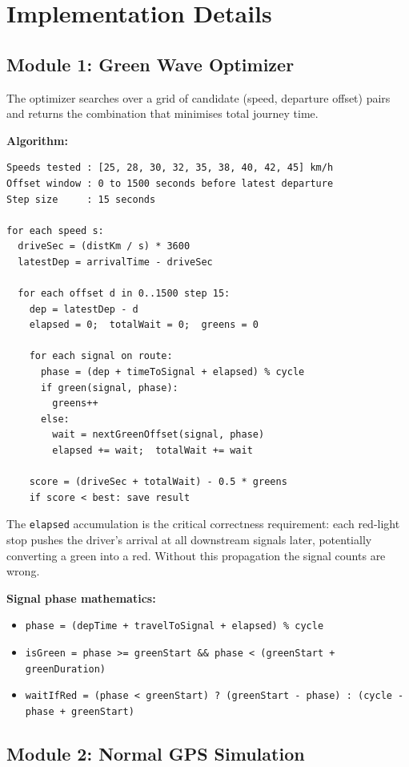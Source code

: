 \documentclass[12pt,a4paper]{report}
\begin{document}
\section{Implementation Details}

\subsection{Module 1: Green Wave Optimizer}

The optimizer searches over a grid of candidate (speed, departure offset) pairs
and returns the combination that minimises total journey time.

\textbf{Algorithm:}
\begin{lstlisting}
Speeds tested : [25, 28, 30, 32, 35, 38, 40, 42, 45] km/h
Offset window : 0 to 1500 seconds before latest departure
Step size     : 15 seconds

for each speed s:
  driveSec = (distKm / s) * 3600
  latestDep = arrivalTime - driveSec

  for each offset d in 0..1500 step 15:
    dep = latestDep - d
    elapsed = 0;  totalWait = 0;  greens = 0

    for each signal on route:
      phase = (dep + timeToSignal + elapsed) % cycle
      if green(signal, phase):
        greens++
      else:
        wait = nextGreenOffset(signal, phase)
        elapsed += wait;  totalWait += wait

    score = (driveSec + totalWait) - 0.5 * greens
    if score < best: save result
\end{lstlisting}

The \texttt{elapsed} accumulation is the critical correctness requirement: each
red-light stop pushes the driver's arrival at all downstream signals later,
potentially converting a green into a red. Without this propagation the signal
counts are wrong.

\textbf{Signal phase mathematics:}
\begin{itemize}
  \item \texttt{phase = (depTime + travelToSignal + elapsed) \% cycle}
  \item \texttt{isGreen = phase >= greenStart \&\& phase < (greenStart +
    greenDuration)}
  \item \texttt{waitIfRed = (phase < greenStart) ? (greenStart - phase) :
    (cycle - phase + greenStart)}
\end{itemize}

\subsection{Module 2: Normal GPS Simulation}
\end{document}
